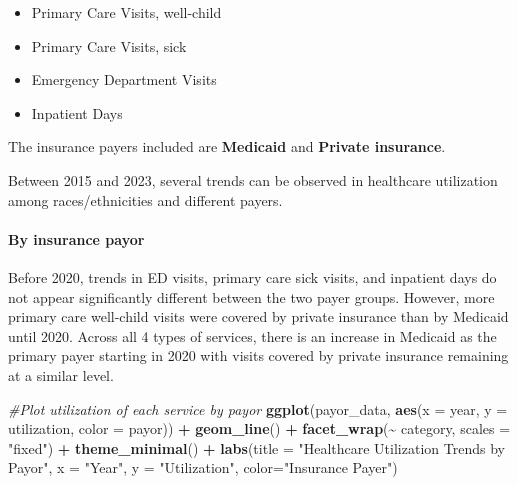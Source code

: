 \documentclass[
]{article}
\newenvironment{Shaded}{\begin{snugshade}}{\end{snugshade}}
\newcommand{\AttributeTok}[1]{\textcolor[rgb]{0.13,0.29,0.53}{#1}}
\newcommand{\CommentTok}[1]{\textcolor[rgb]{0.56,0.35,0.01}{\textit{#1}}}
\newcommand{\FunctionTok}[1]{\textcolor[rgb]{0.13,0.29,0.53}{\textbf{#1}}}
\newcommand{\NormalTok}[1]{#1}
\newcommand{\SpecialCharTok}[1]{\textcolor[rgb]{0.81,0.36,0.00}{\textbf{#1}}}
\newcommand{\StringTok}[1]{\textcolor[rgb]{0.31,0.60,0.02}{#1}}
\providecommand{\tightlist}{%
  \setlength{\itemsep}{0pt}\setlength{\parskip}{0pt}}
\begin{document}
\begin{itemize}
\tightlist
\item
  Primary Care Visits, well-child
\item
  Primary Care Visits, sick
\item
  Emergency Department Visits
\item
  Inpatient Days
\end{itemize}

The insurance payers included are \textbf{Medicaid} and \textbf{Private
insurance}.

Between 2015 and 2023, several trends can be observed in healthcare
utilization among races/ethnicities and different payers.

\hypertarget{by-insurance-payor}{%
\paragraph{By insurance payor}\label{by-insurance-payor}}

Before 2020, trends in ED visits, primary care sick visits, and
inpatient days do not appear significantly different between the two
payer groups. However, more primary care well-child visits were covered
by private insurance than by Medicaid until 2020. Across all 4 types of
services, there is an increase in Medicaid as the primary payer starting
in 2020 with visits covered by private insurance remaining at a similar
level.

\begin{Shaded}
\begin{Highlighting}[]
\CommentTok{\#Plot utilization of each service by payor}
\FunctionTok{ggplot}\NormalTok{(payor\_data, }\FunctionTok{aes}\NormalTok{(}\AttributeTok{x =}\NormalTok{ year, }\AttributeTok{y =}\NormalTok{ utilization, }\AttributeTok{color =}\NormalTok{ payor)) }\SpecialCharTok{+}
  \FunctionTok{geom\_line}\NormalTok{() }\SpecialCharTok{+}
  \FunctionTok{facet\_wrap}\NormalTok{(}\SpecialCharTok{\textasciitilde{}}\NormalTok{ category, }\AttributeTok{scales =} \StringTok{"fixed"}\NormalTok{) }\SpecialCharTok{+}
  \FunctionTok{theme\_minimal}\NormalTok{() }\SpecialCharTok{+}
  \FunctionTok{labs}\NormalTok{(}\AttributeTok{title =} \StringTok{"Healthcare Utilization Trends by Payor"}\NormalTok{, }\AttributeTok{x =} \StringTok{"Year"}\NormalTok{, }\AttributeTok{y =} \StringTok{"Utilization"}\NormalTok{, }\AttributeTok{color=}\StringTok{"Insurance Payer"}\NormalTok{)}
\end{Highlighting}
\end{Shaded}
\end{document}
